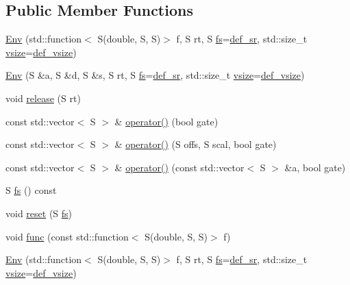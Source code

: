 \subsection*{Public Member Functions}
\begin{DoxyCompactItemize}
\item 
\hyperlink{class_aurora_1_1_env_a500fe7e05d736a21c801ffa480aceed7}{Env} (std\+::function$<$ S(double, S, S)$>$ f, S rt, S \hyperlink{class_aurora_1_1_env_a8b83ca686cce4fc31b03b1de847bc062}{fs}=\hyperlink{namespace_aurora_ad49263d809bea98dd422e95bc91bc03e}{def\+\_\+sr}, std\+::size\+\_\+t \hyperlink{class_aurora_1_1_snd_base_af9e21aaf411b17f7a8221c991ce5d291}{vsize}=\hyperlink{namespace_aurora_afaaddf667a06e7ce23c667a8b7295263}{def\+\_\+vsize})
\item 
\hyperlink{class_aurora_1_1_env_a7a019299406bd5a3f8842194c0cbce09}{Env} (S \&a, S \&d, S \&s, S rt, S \hyperlink{class_aurora_1_1_env_a8b83ca686cce4fc31b03b1de847bc062}{fs}=\hyperlink{namespace_aurora_ad49263d809bea98dd422e95bc91bc03e}{def\+\_\+sr}, std\+::size\+\_\+t \hyperlink{class_aurora_1_1_snd_base_af9e21aaf411b17f7a8221c991ce5d291}{vsize}=\hyperlink{namespace_aurora_afaaddf667a06e7ce23c667a8b7295263}{def\+\_\+vsize})
\item 
void \hyperlink{class_aurora_1_1_env_a2e52ca727b587d89e13a6c3832786f22}{release} (S rt)
\item 
const std\+::vector$<$ S $>$ \& \hyperlink{class_aurora_1_1_env_ae4e2dec694f0be0f0efa5b073a06fef5}{operator()} (bool gate)
\item 
const std\+::vector$<$ S $>$ \& \hyperlink{class_aurora_1_1_env_a664e3c6ce7e66de66305ab220c116792}{operator()} (S offs, S scal, bool gate)
\item 
const std\+::vector$<$ S $>$ \& \hyperlink{class_aurora_1_1_env_a577d95d24fd9f5c5796210874623c650}{operator()} (const std\+::vector$<$ S $>$ \&a, bool gate)
\item 
S \hyperlink{class_aurora_1_1_env_a8b83ca686cce4fc31b03b1de847bc062}{fs} () const
\item 
void \hyperlink{class_aurora_1_1_env_a12db5d285b749a7e1fed988d344d3bc9}{reset} (S \hyperlink{class_aurora_1_1_env_a8b83ca686cce4fc31b03b1de847bc062}{fs})
\item 
void \hyperlink{class_aurora_1_1_env_a92aec91bb78127cf50d5d841870cce14}{func} (const std\+::function$<$ S(double, S, S)$>$ f)
\item 
\hyperlink{class_aurora_1_1_env_a500fe7e05d736a21c801ffa480aceed7}{Env} (std\+::function$<$ S(double, S, S)$>$ f, S rt, S \hyperlink{class_aurora_1_1_env_a8b83ca686cce4fc31b03b1de847bc062}{fs}=\hyperlink{namespace_aurora_ad49263d809bea98dd422e95bc91bc03e}{def\+\_\+sr}, std\+::size\+\_\+t \hyperlink{class_aurora_1_1_snd_base_af9e21aaf411b17f7a8221c991ce5d291}{vsize}=\hyperlink{namespace_aurora_afaaddf667a06e7ce23c667a8b7295263}{def\+\_\+vsize})

\end{DoxyCompactItemize}
